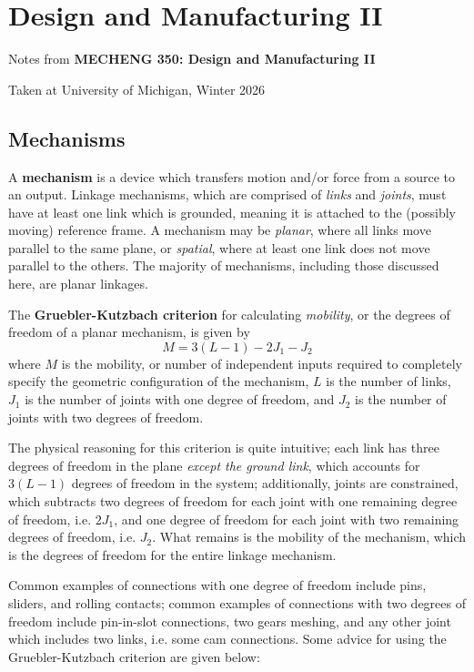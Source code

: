 \section{Design and Manufacturing II}

\begin{center}
    Notes from \textbf{MECHENG 350: Design and Manufacturing II}
    
    Taken at University of Michigan, Winter 2026
\end{center}

\subsection{Mechanisms}

A \textbf{mechanism} is a device which transfers motion and/or force from a source to an output. Linkage mechanisms, which are comprised of \textit{links} and \textit{joints}, must have at least one link which is grounded, meaning it is attached to the (possibly moving) reference frame. A mechanism may be \textit{planar}, where all links move parallel to the same plane, or \textit{spatial}, where at least one link does not move parallel to the others. The majority of mechanisms, including those discussed here, are planar linkages.

The \textbf{Gruebler-Kutzbach criterion} for calculating \textit{mobility}, or the degrees of freedom of a planar mechanism, is given by \[M = 3(L-1)-2J_1 -J_2\tag{Gruebler-Kutzbach Criterion}\] where $M$ is the mobility, or number of independent inputs required to completely specify the geometric configuration of the mechanism, $L$ is the number of links, $J_1$ is the number of joints with one degree of freedom, and $J_2$ is the number of joints with two degrees of freedom. 

The physical reasoning for this criterion is quite intuitive; each link has three degrees of freedom in the plane \textit{except the ground link}, which accounts for $3(L-1)$ degrees of freedom in the system; additionally, joints are constrained, which subtracts two degrees of freedom for each joint with one remaining degree of freedom, i.e. $2J_1$, and one degree of freedom for each joint with two remaining degrees of freedom, i.e. $J_2$. What remains is the mobility of the mechanism, which is the degrees of freedom for the entire linkage mechanism.

Common examples of connections with one degree of freedom include pins, sliders, and rolling contacts; common examples of connections with two degrees of freedom include pin-in-slot connections, two gears meshing, and any other joint which includes two links, i.e. some cam connections. Some advice for using the Gruebler-Kutzbach criterion are given below:

